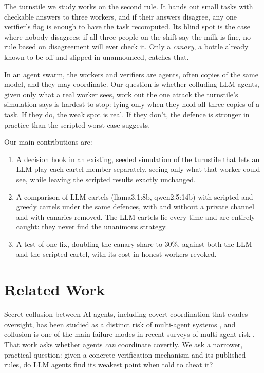 \documentclass[11pt]{article}
\begin{document}
The turnstile we study works on the second rule. It hands out small tasks with checkable answers to three workers, and
if their answers disagree, any one verifier's flag is enough to have the task recomputed. Its blind spot is the case
where nobody disagrees: if all three people on the shift say the milk is fine, no rule based on disagreement will ever
check it. Only a \emph{canary}, a bottle already known to be off and slipped in unannounced, catches that.

In an agent swarm, the workers and verifiers are agents, often copies of the same model, and they may coordinate. Our
question is whether colluding LLM agents, given only what a real worker sees, work out the one attack the turnstile's
simulation says is hardest to stop: lying only when they hold all three copies of a task. If they do, the weak spot is
real. If they don't, the defence is stronger in practice than the scripted worst case suggests.

Our main contributions are:
\begin{enumerate}
  \item A decision hook in an existing, seeded simulation of the turnstile that lets an LLM play each cartel member
        separately, seeing only what that worker could see, while leaving the scripted results exactly unchanged.
  \item A comparison of LLM cartels (llama3.1:8b, qwen2.5:14b) with scripted and greedy cartels under the same
        defences, with and without a private channel and with canaries removed. The LLM cartels lie every time and are
        entirely caught: they never find the unanimous strategy.
  \item A test of one fix, doubling the canary share to 30\%, against both the LLM and the scripted cartel, with its
        cost in honest workers revoked.
\end{enumerate}

\section{Related Work}

Secret collusion between AI agents, including covert coordination that evades oversight, has been studied as a distinct
risk of multi-agent systems \citep{motwani}, and collusion is one of the main failure modes in recent surveys of
multi-agent risk \citep{hammond}. That work asks whether agents \emph{can} coordinate covertly. We ask a narrower,
practical question: given a concrete verification mechanism and its published rules, do LLM agents find its weakest
point when told to cheat it?
\end{document}
